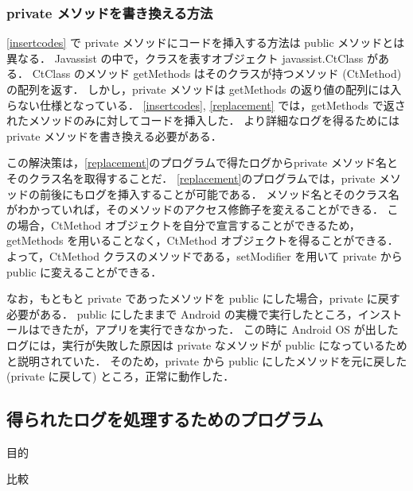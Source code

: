 \subsubsection{private メソッドを書き換える方法}
\label{private}
\ref{insertcodes} で 
private メソッドにコードを挿入する方法は public メソッドとは異なる．
Javassist の中で，クラスを表すオブジェクト javassist.CtClass がある．
CtClass のメソッド getMethods はそのクラスが持つメソッド (CtMethod) の配列を返す．
しかし，private メソッドは getMethods の返り値の配列には入らない仕様となっている．
\ref{insertcodes}, \ref{replacement} では，getMethods で返されたメソッドのみに対してコードを挿入した．
より詳細なログを得るためには private メソッドを書き換える必要がある．

この解決策は，\ref{replacement}のプログラムで得たログからprivate メソッド名とそのクラス名を取得することだ．
\ref{replacement}のプログラムでは，private メソッドの前後にもログを挿入することが可能である．
メソッド名とそのクラス名がわかっていれば，そのメソッドのアクセス修飾子を変えることができる．
この場合，CtMethod オブジェクトを自分で宣言することができるため，getMethods を用いることなく，CtMethod オブジェクトを得ることができる． 
よって，CtMethod クラスのメソッドである，setModifier を用いて private から public に変えることができる．

なお，もともと private であったメソッドを public にした場合，private に戻す必要がある．
public にしたままで Android の実機で実行したところ，インストールはできたが，アプリを実行できなかった．
この時に Android OS が出したログには，実行が失敗した原因は private なメソッドが public になっているためと説明されていた．
そのため，private から public にしたメソッドを元に戻した(private に戻して) ところ，正常に動作した．

\subsection{得られたログを処理するためのプログラム}
\label{splitscript}
目的

比較

